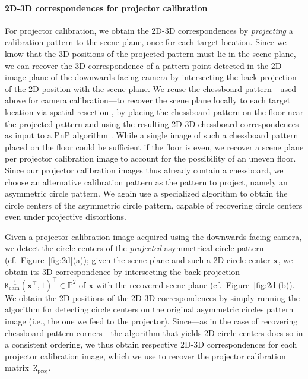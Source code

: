 \documentclass[review]{elsarticle}
\begin{document}
\paragraph{2D-3D correspondences for projector calibration} For projector calibration, we obtain the 2D-3D correspondences by \textit{projecting} a calibration pattern to the scene plane, once for each target location. Since we know that the 3D positions of the projected pattern must lie in the scene plane, we can recover the 3D correspondence of a pattern point detected in the 2D image plane of the downwards-facing camera by intersecting the back-projection of the 2D position with the scene plane. We reuse the chessboard pattern---used above for camera calibration---to recover the scene plane locally to each target location via spatial resection \cite{Hartley2004}, by placing the chessboard pattern on the floor near the projected pattern and using the resulting 2D-3D chessboard correspondences as input to a PnP algorithm \cite{collins2014infinitesimal}. While a single image of such a chessboard pattern placed on the floor could be sufficient if the floor is even, we recover a scene plane per projector calibration image to account for the possibility of an uneven floor. Since our projector calibration images thus already contain a chessboard, we choose an alternative calibration pattern as the pattern to project, namely an asymmetric circle pattern. We again use a specialized algorithm \cite{bradski2000opencv} to obtain the circle centers of the asymmetric circle pattern, capable of recovering circle centers even under projective distortions. 

Given a projector calibration image acquired using the downwards-facing camera, we detect the circle centers of the \textit{projected} asymmetrical circle pattern (cf.\ Figure~\ref{fig:2d}(a)); given the scene plane and such a 2D circle center $\mathbf{x}$, we obtain its 3D correspondence by intersecting the back-projection~$\mathtt{K}_\text{cam}^{-1}(\mathbf{x}^\top, 1)^\top \in \mathbb{P}^2$ of $\mathbf{x}$ with the recovered scene plane (cf.\ Figure~\ref{fig:2d}(b)). We obtain the 2D positions of the 2D-3D correspondences by simply running the algorithm for detecting circle centers on the original asymmetric circles pattern image (i.e., the one we feed to the projector). Since---as in the case of recovering chessboard pattern corners---the algorithm that yields 2D circle centers does so in a consistent ordering, we thus obtain respective 2D-3D correspondences for each projector calibration image, which we use to recover the projector calibration matrix~$\mathtt{K}_\text{proj}$.
\end{document}
